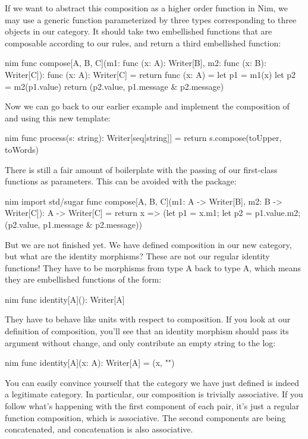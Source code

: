 If we want to abstract this composition as a higher order function in
Nim, we may use a generic function parameterized by three types
corresponding to three objects in our category. It should take two
embellished functions that are composable according to our rules, and
return a third embellished function:

\begin{snip}{nim}
func compose[A, B, C](m1: func (x: A): Writer[B], m2: func (x: B): Writer[C]): func (x: A): Writer[C] =
  return func (x: A) =
    let p1 = m1(x)
    let p2 = m2(p1.value)
    return (p2.value, p1.message & p2.message)
\end{snip}
Now we can go back to our earlier example and implement the composition
of  and  using this new template:

\begin{snip}{nim}
func process(s: string): Writer[seq[string]] =
  return s.compose(toUpper, toWords)
\end{snip}
There is still a fair amount of boilerplate with the passing of our first-class
functions as parameters. This can be avoided with the  package:

\begin{snip}{nim}
import std/sugar
func compose[A, B, C](m1: A -> Writer[B], m2: B -> Writer[C]): A -> Writer[C] =
  return x => (let p1 = x.m1; let p2 = p1.value.m2; (p2.value, p1.message & p2.message))
\end{snip}
But we are not finished yet. We have defined composition in our new
category, but what are the identity morphisms? These are not our regular
identity functions! They have to be morphisms from type A back to type
A, which means they are embellished functions of the form:

\begin{snip}{nim}
func identity[A](): Writer[A]
\end{snip}
They have to behave like units with respect to composition. If you look
at our definition of composition, you'll see that an identity morphism
should pass its argument without change, and only contribute an empty
string to the log:

\begin{snip}{nim}
func identity[A](x: A): Writer[A] = (x, "")
\end{snip}
You can easily convince yourself that the category we have just defined
is indeed a legitimate category. In particular, our composition is
trivially associative. If you follow what's happening with the first
component of each pair, it's just a regular function composition, which
is associative. The second components are being concatenated, and
concatenation is also associative.

